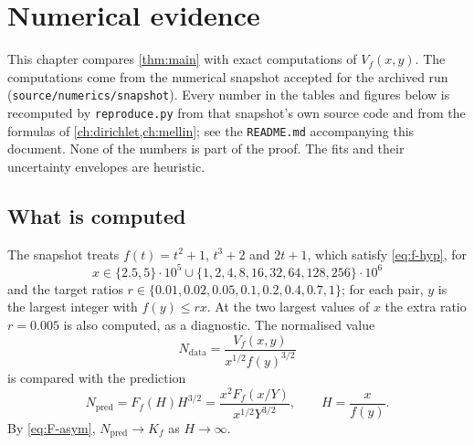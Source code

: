 \chapter{Numerical evidence}\label{ch:numerics}

This chapter compares \cref{thm:main} with exact computations of $V_f(x,y)$. The computations come from the numerical snapshot accepted for the archived run (\texttt{source/numerics/snapshot}). Every number in the tables and figures below is recomputed by \texttt{reproduce.py} from that snapshot's own source code and from the formulas of \cref{ch:dirichlet,ch:mellin}; see the \texttt{README.md} accompanying this document. None of the numbers is part of the proof. The fits and their uncertainty envelopes are heuristic.

\section{What is computed}

The snapshot treats $f(t)=t^2+1$, $t^3+2$ and $2t+1$, which satisfy \eqref{eq:f-hyp}, for
\[
x\in\{2.5,5\}\cdot10^5\cup\{1,2,4,8,16,32,64,128,256\}\cdot10^6
\]
and the target ratios $r\in\{0.01,0.02,0.05,0.1,0.2,0.4,0.7,1\}$; for each pair, $y$ is the largest integer with $f(y)\le rx$. At the two largest values of $x$ the extra ratio $r=0.005$ is also computed, as a diagnostic. The normalised value
\[
N_{\mathrm{data}}=\frac{V_f(x,y)}{x^{1/2}f(y)^{3/2}}
\]
is compared with the prediction
\[
N_{\mathrm{pred}}=F_f(H)H^{3/2}=\frac{x^2F_f(x/Y)}{x^{1/2}Y^{3/2}},\qquad H=\frac x{f(y)}.
\]
By \eqref{eq:F-asym}, $N_{\mathrm{pred}}\to K_f$ as $H\to\infty$.

